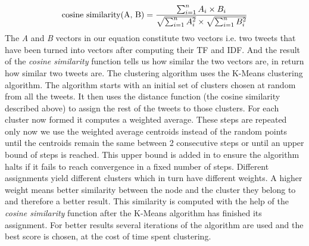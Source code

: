 \begin{equation}
	\text{cosine similarity(A, B)} = {\sum_{i=1}^{n} A_i \times B_i \over
				\sqrt{\sum_{i=1}^{n} A_i^2} \times \sqrt{\sum_{i=1}^{n} B_i^2 }}
\end{equation}
\newline
The \textit{A} and \textit{B} vectors in our equation constitute two vectors i.e. two tweets that have been turned into vectors after computing their TF and IDF. And the result of the \textit{cosine similarity} function tells us how similar the two vectors are, in return how similar two tweets are.
\newline
\newline
The clustering algorithm uses the K-Means clustering algorithm. The algorithm starts with an initial set of clusters chosen at random from all the tweets. It then uses the distance function (the cosine similarity described above) to assign the rest of the tweets to those clusters. For each cluster now formed it computes a weighted average. These steps are repeated only now we use the weighted average centroids instead of the random points until the centroids remain the same between 2 consecutive steps or until an upper bound of steps is reached. This upper bound is added in to ensure the algorithm halts if it fails to reach convergence in a fixed number of steps.
\newline
\newline
Different assignments yield different clusters which in turn have different weights. A higher weight means better similarity between the node and the cluster they belong to and therefore a better result. This similarity is computed with the help of the \textit{cosine similarity} function after the K-Means algorithm has finished its assignment. For better results several iterations of the algorithm are used and the best score is chosen, at the cost of time spent clustering.
\newline
\newline
